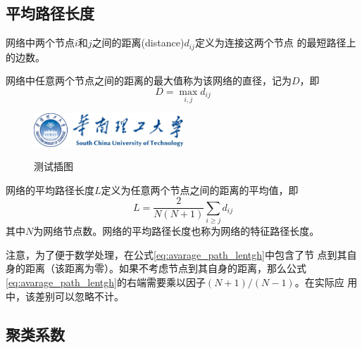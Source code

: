 \documentclass[phd,nobackinfo]{scutthesis}
\begin{document}
\subsection{平均路径长度}

\begin{definition}[节点之间的距离]
网络中两个节点$i$和$j$之间的距离(distance)$d_{ij}$定义为连接这两个节点
的最短路径上的边数。
\end{definition}

\begin{definition}[直径]
网络中任意两个节点之间的距离的最大值称为该网络的直径，记为$D$，即
\begin{equation}\label{eq:dimension}
    D = \max_{i,j} d_{ij}
\end{equation}
\end{definition}


\begin{figure}[htbp]
  \centering
  \includegraphics[width= 0.5\textwidth]{scutlogo.eps}\\
  \caption{测试插图}\label{fig:test3}
\end{figure}

\begin{definition}[平均路径长度]
网络的平均路径长度$L$定义为任意两个节点之间的距离的平均值，即
\begin{equation}\label{eq:avarage_path_lentgh}
    L = \frac{2}{N(N+1)}\sum_{i\geq j}d_{ij}
\end{equation}
其中$N$为网络节点数。网络的平均路径长度也称为网络的特征路径长度。
\end{definition}

注意，为了便于数学处理，在公式\eqref{eq:avarage_path_lentgh}中包含了节
点到其自身的距离（该距离为零）。如果不考虑节点到其自身的距离，那么公式
\eqref{eq:avarage_path_lentgh}的右端需要乘以因子$(N+1)/(N-1)$。在实际应
用中，该差别可以忽略不计。

\subsection{聚类系数}
\end{document}
